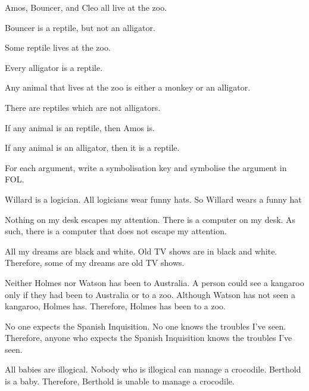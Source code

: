 \begin{earg}
\item Amos, Bouncer, and Cleo all live at the zoo. 
\item Bouncer is a reptile, but not an alligator. 
\item Some reptile lives at the zoo. 
\item Every alligator is a reptile. 
\item Any animal that lives at the zoo is either a monkey or an alligator. 
\item There are reptiles which are not alligators.
\item If any animal is an reptile, then Amos is.
\item If any animal is an alligator, then it is a reptile.
\end{earg}

\problempart
\label{pr.FOLarguments}
For each argument, write a symbolisation key and symbolise the argument in FOL.
\begin{earg}
\item Willard is a logician. All logicians wear funny hats. So Willard wears a funny hat
\item Nothing on my desk escapes my attention. There is a computer on my desk. As such, there is a computer that does not escape my attention.
\item All my dreams are black and white. Old TV shows are in black and white. Therefore, some of my dreams are old TV shows.
\item Neither Holmes nor Watson has been to Australia. A person could see a kangaroo only if they had been to Australia or to a zoo. Although Watson has not seen a kangaroo, Holmes has. Therefore, Holmes has been to a zoo.
\item No one expects the Spanish Inquisition. No one knows the troubles I've seen. Therefore, anyone who expects the Spanish Inquisition knows the troubles I've seen.
\item All babies are illogical. Nobody who is illogical can manage a crocodile. Berthold is a baby. Therefore, Berthold is unable to manage a crocodile.
\end{earg}

